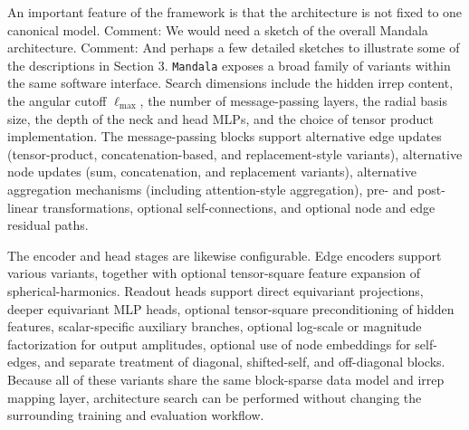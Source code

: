 An important feature of the framework is that the architecture is not fixed to
one canonical model.
Comment: We would need a sketch of the overall Mandala architecture.
Comment: And perhaps a few detailed sketches to illustrate some of the descriptions in Section 3.
\texttt{Mandala} exposes a broad family of variants within the same
software interface. Search dimensions include the hidden irrep content, the
angular cutoff $\ell_{\max}$, the number of message-passing layers, the radial
basis size, the depth of the neck and head MLPs, and the choice of tensor
product implementation. The message-passing blocks support alternative edge
updates (tensor-product, concatenation-based, and replacement-style variants),
alternative node updates (sum, concatenation, and replacement variants),
alternative aggregation mechanisms (including attention-style aggregation),
pre- and post-linear transformations, optional self-connections, and optional
node and edge residual paths.

The encoder and head stages are likewise configurable. Edge encoders support
various variants, together with optional tensor-square
feature expansion of spherical-harmonics. Readout heads support direct
equivariant projections, deeper equivariant MLP heads, optional tensor-square
preconditioning of hidden features, scalar-specific auxiliary branches, optional
log-scale or magnitude factorization for output amplitudes, optional use of node
embeddings for self-edges, and separate treatment of diagonal, shifted-self,
and off-diagonal blocks. Because all of these variants share the same
block-sparse data model and irrep mapping layer, architecture search can be
performed without changing the surrounding training and evaluation workflow.
